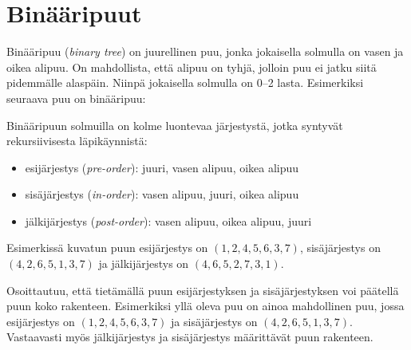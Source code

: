 \section{Binääripuut}

\begin{samepage}
Binääripuu (\textit{binary tree}) on juurellinen puu,
jonka jokaisella solmulla on vasen ja oikea alipuu.
On mahdollista, että alipuu on tyhjä,
jolloin puu ei jatku siitä pidemmälle alaspäin.
Niinpä jokaisella solmulla on 0--2 lasta.
Esimerkiksi seuraava puu on binääripuu:

\begin{center}
\end{center}
\end{samepage}

Binääripuun solmuilla on kolme luontevaa järjestystä,
jotka syntyvät rekursiivisesta läpikäynnistä:

\begin{itemize}
\item esijärjestys (\textit{pre-order}): juuri, vasen alipuu, oikea alipuu
\item sisäjärjestys (\textit{in-order}): vasen alipuu, juuri, oikea alipuu
\item jälkijärjestys (\textit{post-order}): vasen alipuu, oikea alipuu, juuri
\end{itemize}

Esimerkissä kuvatun puun esijärjestys on
$(1,2,4,5,6,3,7)$,
sisäjärjestys on $(4,2,6,5,1,3,7)$
ja jälkijärjestys on $(4,6,5,2,7,3,1)$.

Osoittautuu, että tietämällä puun esijärjestyksen
ja sisäjärjestyksen voi päätellä puun koko rakenteen.
Esimerkiksi yllä oleva puu on ainoa mahdollinen
puu, jossa esijärjestys on
$(1,2,4,5,6,3,7)$ ja sisäjärjestys on $(4,2,6,5,1,3,7)$.
Vastaavasti myös jälkijärjestys ja sisäjärjestys
määrittävät puun rakenteen.

